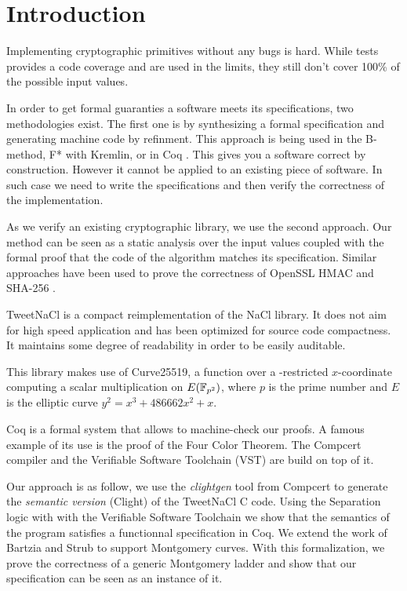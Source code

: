 \section{Introduction}

Implementing cryptographic primitives without any bugs is hard.
While tests provides a code coverage and are used in the limits,
they still don't cover 100\% of the possible input values.

In order to get formal guaranties a software meets its specifications,
two methodologies exist. The first one is by synthesizing a formal specification and
generating machine code by refinment. This approach is being used in the
B-method\cite{Abrial:1996:BAP:236705}, F* \cite{DBLP:journals/corr/BhargavanDFHPRR17} with Kremlin, or in Coq \cite{CpdtJFR}.
This gives you a software correct by construction. However it cannot be applied
to an existing piece of software. In such case we need to write the specifications
and then verify the correctness of the implementation.

As we verify an existing cryptographic library, we use the second approach.
Our method can be seen as a static analysis over the input values coupled
with the formal proof that the code of the algorithm matches its specification.
Similar approaches have been used to prove the correctness of OpenSSL HMAC
\cite{Beringer2015VerifiedCA} and SHA-256 \cite{Appel2015VerificationOA}.

TweetNaCl\cite{BGJ+15} is a compact reimplementation of the
NaCl\cite{BLS12} library. It does not aim for high speed
application and has been optimized for source code compactness.
It maintains some degree of readability in order to be easily auditable.

This library makes use of Curve25519\cite{Ber06}, a function over a -restricted
$x$-coordinate computing a scalar multiplication on $E(\mathbb{F}_{p^2})$, where $p$ is
the prime number \p and $E$ is the elliptic curve $y^2 = x^3 + 486662 x^2 + x$.

Coq is a formal system that allows to machine-check our proofs.
A famous example of its use is the proof of the Four Color Theorem.
The Compcert\cite{Leroy-backend} compiler and the Verifiable Software Toolchain
(VST)\cite{2012-Appel} are build on top of it.

Our approach is as follow, we use the \textit{clightgen} tool from Compcert to
generate the \textit{semantic version} (Clight\cite{Blazy-Leroy-Clight-09}) of
the TweetNaCl C code.
Using the Separation logic\cite{1969-Hoare,Reynolds02separationlogic}
with with the Verifiable Software Toolchain we show that the semantics of the
program satisfies a functionnal specification in Coq.
We extend the work of Bartzia and Strub \cite{DBLP:conf/itp/BartziaS14} to
support Montgomery curves.
With this formalization, we prove the correctness of a generic Montgomery ladder
and show that our specification can be seen as an instance of it.
